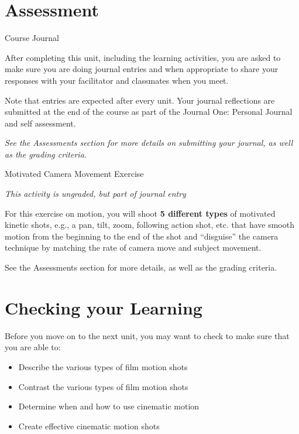 \documentclass[
]{book}
\providecommand{\tightlist}{%
  \setlength{\itemsep}{0pt}\setlength{\parskip}{0pt}}
\begin{document}
\hypertarget{assessment-7}{%
\section*{Assessment}\label{assessment-7}}

\begin{assessment}
{Course Journal}

After completing this unit, including the learning activities, you are asked to make sure you are doing journal entries and when appropriate to share your responses with your facilitator and classmates when you meet.

Note that entries are expected after every unit. Your journal reflections are submitted at the end of the course as part of the Journal One: Personal Journal and self assessment.

\emph{See the Assessments section for more details on submitting your journal, as well as the grading criteria.}

{Motivated Camera Movement Exercise}

\emph{This activity is ungraded, but part of journal entry}

For this exercise on motion, you will shoot \textbf{5 different types} of motivated kinetic shots, e.g., a pan, tilt, zoom, following action shot, etc. that have smooth motion from the beginning to the end of the shot and ``disguise'' the camera technique by matching the rate of camera move and subject movement.

See the Assessments section for more details, as well as the grading criteria.
\end{assessment}

\hypertarget{checking-your-learning-3}{%
\section*{Checking your Learning}\label{checking-your-learning-3}}

\begin{progress}
Before you move on to the next unit, you may want to check to make sure that you are able to:

\begin{itemize}
\tightlist
\item
  Describe the various types of film motion shots
\item
  Contrast the various types of film motion shots
\item
  Determine when and how to use cinematic motion
\item
  Create effective cinematic motion shots
\end{itemize}
\end{progress}
\end{document}
